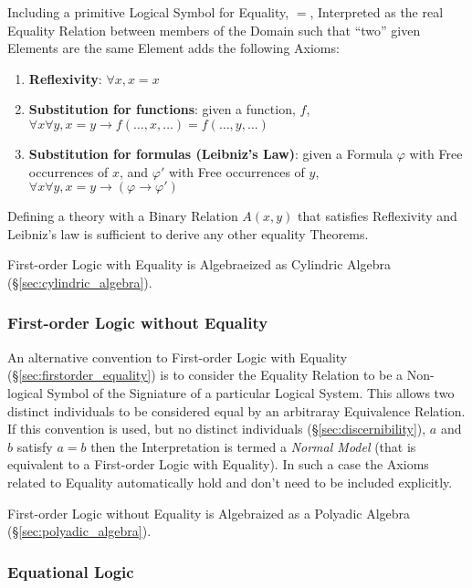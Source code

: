 Including a primitive Logical Symbol for Equality, $=$, Interpreted as
the real Equality Relation between members of the Domain such that
``two'' given Elements are the same Element adds the following Axioms:

\begin{enumerate}
\item \textbf{Reflexivity}: $\forall x, x=x$
\item \textbf{Substitution for functions}: given a function, $f$,
  $\forall x \forall y, x = y \rightarrow f(\ldots,x,\ldots) =
  f(\ldots,y,\ldots)$
\item \textbf{Substitution for formulas (Leibniz's Law)}: given a
  Formula $\varphi$ with Free occurrences of $x$, and $\varphi '$ with
  Free occurrences of $y$, $\forall x \forall y, x = y \rightarrow
  (\varphi \rightarrow \varphi ')$
\end{enumerate}

Defining a theory with a Binary Relation $A(x,y)$ that satisfies
Reflexivity and Leibniz's law is sufficient to derive any other
equality Theorems.

First-order Logic with Equality is Algebraeized as Cylindric Algebra
(\S\ref{sec:cylindric_algebra}).



\subsubsection{First-order Logic without Equality}
\label{sec:firstorder_no_equality}

An alternative convention to First-order Logic with Equality
(\S\ref{sec:firstorder_equality}) is to consider the Equality Relation
to be a Non-logical Symbol of the Signiature of a particular Logical
System. This allows two distinct individuals to be considered equal by
an arbitraray Equivalence Relation. If this convention is used, but no
distinct individuals (\S\ref{sec:discernibility}), $a$ and $b$ satisfy
$a=b$ then the Interpretation is termed a \emph{Normal Model} (that is
equivalent to a First-order Logic with Equality). In such a case the
Axioms related to Equality automatically hold and don't need to be
included explicitly.

First-order Logic without Equality is Algebraized as a Polyadic
Algebra (\S\ref{sec:polyadic_algebra}).



\subsubsection{Equational Logic}\label{sec:equational_logic}

